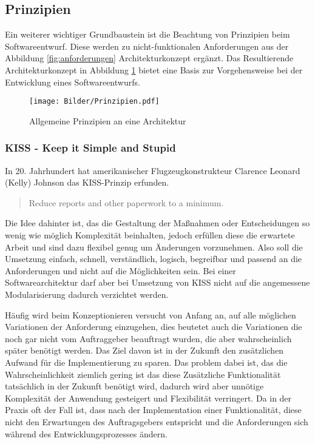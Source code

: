 \subsection{Prinzipien}
Ein weiterer wichtiger Grundbaustein ist die Beachtung von Prinzipien beim Softwareentwurf. Diese werden zu nicht-funktionalen Anforderungen aus der Abbildung \ref{fig:anforderungen} Architekturkonzept ergänzt. Das Resultierende Architekturkonzept in Abbildung \ref{fig:prinzip} bietet eine Basis zur Vorgehensweise bei der Entwicklung eines Softwareentwurfs.
\begin{figure}[H]
\centering
\texttt{[image: Bilder/Prinzipien.pdf]}
\caption{Allgemeine Prinzipien an eine Architektur\label{fig:prinzip}}
\end{figure}

\subsubsection{KISS - Keep it Simple and Stupid}
In 20. Jahrhundert hat amerikanischer Flugzeugkonstrukteur Clarence Leonard (Kelly) Johnson das KISS-Prinzip erfunden.
\begin{quote}
Reduce reports and other paperwork to a minimum.
\end{quote}
Die Idee dahinter ist, das die Gestaltung der Maßnahmen oder Entscheidungen so wenig wie möglich Komplexität beinhalten, jedoch erfüllen diese die erwartete Arbeit und sind dazu flexibel genug um Änderungen vorzunehmen. Also soll die Umsetzung einfach, schnell, verständlich, logisch, begreifbar und passend an die Anforderungen und nicht auf die Möglichkeiten sein. Bei einer Softwarearchitektur darf aber bei Umsetzung von KISS nicht auf die angemessene Modularisierung dadurch verzichtet werden.   

Häufig wird beim Konzeptionieren versucht von Anfang an, auf alle möglichen Variationen der Anforderung einzugehen, dies beutetet auch die Variationen die noch gar nicht vom Auftraggeber beauftragt wurden, die aber wahrscheinlich später benötigt werden. Das Ziel davon ist in der Zukunft den zusätzlichen Aufwand für die Implementierung zu sparen. Das problem dabei ist, das die Wahrscheinlichkeit ziemlich gering ist das diese Zusätzliche Funktionalität tatsächlich in der Zukunft benötigt wird, dadurch wird aber unnötige Komplexität der Anwendung gesteigert und Flexibilität verringert. Da in der Praxis oft der Fall ist, dass nach der Implementation einer Funktionalität, diese nicht den Erwartungen des Auftragsgebers entspricht und die Anforderungen sich während des Entwicklungsprozesses ändern. 

